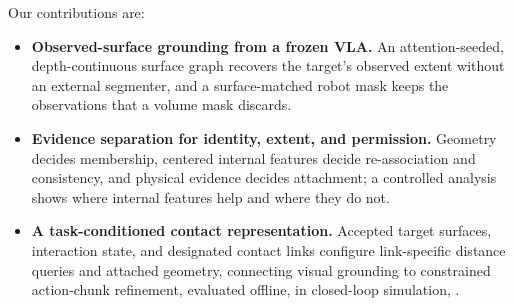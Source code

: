 Our contributions are:
\begin{itemize}
\item \textbf{Observed-surface grounding from a frozen VLA.} An attention-seeded, depth-continuous surface graph recovers the target's observed extent without an external segmenter, and a surface-matched robot mask keeps the observations that a volume mask discards.
\item \textbf{Evidence separation for identity, extent, and permission.} Geometry decides membership, centered internal features decide re-association and consistency, and physical evidence decides attachment; a controlled analysis shows where internal features help and where they do not.
\item \textbf{A task-conditioned contact representation.} Accepted target surfaces, interaction state, and designated contact links configure link-specific distance queries and attached geometry, connecting visual grounding to constrained action-chunk refinement, evaluated offline, in closed-loop simulation, .
\end{itemize}
